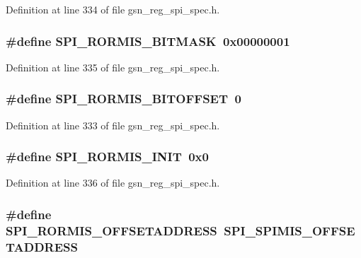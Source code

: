 Definition at line 334 of file gsn\_\-reg\_\-spi\_\-spec.h.

\hypertarget{a00573_a66a4611e83d7a271912739d842e9491c}{
\subsubsection[{SPI\_\-RORMIS\_\-BITMASK}]{\setlength{\rightskip}{0pt plus 5cm}\#define SPI\_\-RORMIS\_\-BITMASK~0x00000001}}
\label{a00573_a66a4611e83d7a271912739d842e9491c}


Definition at line 335 of file gsn\_\-reg\_\-spi\_\-spec.h.

\hypertarget{a00573_a391c430412c0b002a26b239a9f74bfa5}{
\subsubsection[{SPI\_\-RORMIS\_\-BITOFFSET}]{\setlength{\rightskip}{0pt plus 5cm}\#define SPI\_\-RORMIS\_\-BITOFFSET~0}}
\label{a00573_a391c430412c0b002a26b239a9f74bfa5}


Definition at line 333 of file gsn\_\-reg\_\-spi\_\-spec.h.

\hypertarget{a00573_ad2ef79be1d9b4b9ea49852361084b6fd}{
\subsubsection[{SPI\_\-RORMIS\_\-INIT}]{\setlength{\rightskip}{0pt plus 5cm}\#define SPI\_\-RORMIS\_\-INIT~0x0}}
\label{a00573_ad2ef79be1d9b4b9ea49852361084b6fd}


Definition at line 336 of file gsn\_\-reg\_\-spi\_\-spec.h.

\hypertarget{a00573_adc9c3419ae723ecdf769ddd6d18cfb6c}{
\subsubsection[{SPI\_\-RORMIS\_\-OFFSETADDRESS}]{\setlength{\rightskip}{0pt plus 5cm}\#define SPI\_\-RORMIS\_\-OFFSETADDRESS~SPI\_\-SPIMIS\_\-OFFSETADDRESS}}
\label{a00573_adc9c3419ae723ecdf769ddd6d18cfb6c}


